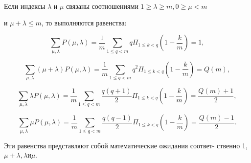 \documentclass{../template/mai_book}
\begin{document}
\begin{lemma}
\slshape{Если индексы $\lambda$ и $\mu$ связаны соотношениями $1 \geqslant  \lambda \geqslant m, 0 \geqslant \mu < m$ \linebreak \newpage 


и $\mu + \lambda \leqslant m$, то выполняются равенства:} \par
 
$$\sum_{\mu,\lambda} P(\mu,\lambda) = \frac{1}{m} \sum_{1 \leqslant q < m} q \Pi_{1 \leqslant k < q} (1 - \frac{k}{m}) = 1,$$ \par 

$$\sum_{\mu,\lambda} (\mu + \lambda) P(\mu,\lambda) = \frac{1}{m} \sum_{1 \leqslant q < m} q^{2} \Pi_{1 \leqslant k < q} (1 - \frac{k}{m}) = Q(m),$$ \par 

$$\sum_{\mu,\lambda} \lambda P(\mu,\lambda) = \frac{1}{m} \sum_{1 \leqslant q < m} \frac{q(q+1)}{2} \Pi_{1 \leqslant k < q} (1 - \frac{k}{m}) = \frac{Q(m)+1}{2},$$ \par 

$$\sum_{\mu,\lambda} \mu P(\mu,\lambda) = \frac{1}{m} \sum_{1 \leqslant q < m} \frac{q(q-1)}{2} \Pi_{1 \leqslant k < q} (1 - \frac{k}{m}) = \frac{Q(m)-1}{2}.$$ \par

\noindent Эти равенства представляют собой математические ожидания соответ- \linebreak ственно 1, $\mu + \lambda, \lambda и \mu$. \par
\end{lemma}
\end{document}
